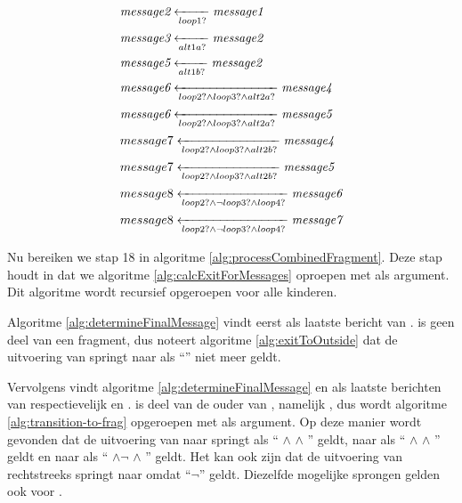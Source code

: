 \begin{align*}
	&\transitionentry[\fragmessage{message1}]{\fragcond{loop1}}{\fragmessage{message2}} \\
	&\transitionentry[\fragmessage{message2}]{\fragcond{alt1a}}{\fragmessage{message3}} \\
	&\transitionentry[\fragmessage{message2}]{\fragcond{alt1b}}{\fragmessage{message5}} \\
	&\transitionentry[\fragmessage{message4}]{\fragcond{loop2} \land \fragcond{loop3} \land \fragcond{alt2a}}{\fragmessage{message6}} \\
	&\transitionentry[\fragmessage{message5}]{\fragcond{loop2} \land \fragcond{loop3} \land \fragcond{alt2a}}{\fragmessage{message6}} \\
	&\transitionentry[\fragmessage{message4}]{\fragcond{loop2} \land \fragcond{loop3} \land \fragcond{alt2b}}{message7} \\
	&\transitionentry[\fragmessage{message5}]{\fragcond{loop2} \land \fragcond{loop3} \land \fragcond{alt2b}}{message7} \\
	&\transitionentry[\fragmessage{message6}]{\fragcond{loop2} \land \lnot \fragcond{loop3} \land \fragcond{loop4}}{message8} \\
	&\transitionentry[\fragmessage{message7}]{\fragcond{loop2} \land \lnot \fragcond{loop3} \land \fragcond{loop4}}{message8}
\end{align*}

Nu bereiken we stap 18 in algoritme \ref{alg:processCombinedFragment}. Deze stap houdt in dat we algoritme \ref{alg:calcExitForMessages} oproepen met  als argument. Dit algoritme wordt recursief opgeroepen voor alle kinderen.

Algoritme \ref{alg:determineFinalMessage} vindt eerst  als laatste bericht van .  is geen deel van een fragment, dus noteert algoritme \ref{alg:exitToOutside} dat de uitvoering van  springt naar  als ``'' niet meer geldt.

Vervolgens vindt algoritme \ref{alg:determineFinalMessage}  en  als laatste berichten van respectievelijk  en .  is deel van de ouder van , namelijk , dus wordt algoritme \ref{alg:transition-to-frag} opgeroepen met  als argument. Op deze manier wordt gevonden dat de uitvoering van  naar  springt als `` $\land$  $\land$ '' geldt, naar  als `` $\land$  $\land$ '' geldt en naar  als `` $\land \lnot$  $\land$ '' geldt. Het kan ook zijn dat de uitvoering van  rechtstreeks springt naar  omdat ``$\lnot$'' geldt. Diezelfde mogelijke sprongen gelden ook voor .

